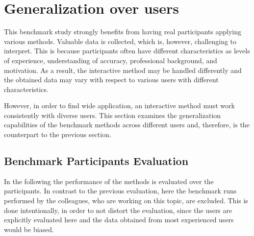 
\section{Generalization over users}\label{ord:ch5:sec_3_generalization_user}

This benchmark study strongly benefits from having real participants applying various methods.
Valuable data is collected, which is, however, challenging to interpret.
This is because participants often have different characteristics as levels of experience, understanding of accuracy, professional background, and motivation.
As a result, the interactive method may be handled differently and the obtained data may vary with respect to various users with different characteristics. 

However, in order to find wide application, an interactive method must work consistently with diverse users.
This section examines the generalization capabilities of the benchmark methods across different users and, therefore, is the counterpart to the previous section.




\subsection{Benchmark Participants Evaluation}\label{ord:ch5:sec3:subsec1}

In the following the performance of the methods is evaluated over the \getNumberBenchmarkParticipants participants.
In contrast to the previous evaluation, here the benchmark runs performed by the colleagues, who are working on this topic, are excluded.
This is done intentionally, in order to not distort the evaluation, since the users are explicitly evaluated here and the data obtained from most experienced users would be biased.

